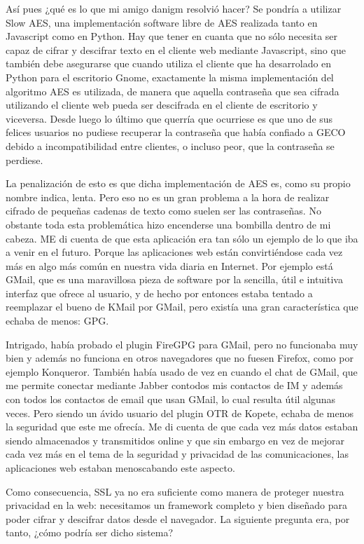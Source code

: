 Así pues ¿qué es lo que mi amigo danigm resolvió hacer? Se pondría a utilizar Slow AES, una implementación software libre de AES realizada tanto en Javascript como en Python. Hay que tener en cuanta que no sólo necesita ser capaz de cifrar y descifrar texto en el cliente web mediante Javascript, sino que también debe asegurarse que cuando utiliza el cliente que ha desarrolado en Python para el escritorio Gnome, exactamente la misma implementación del algoritmo AES es utilizada, de manera que aquella contraseña que sea cifrada utilizando el cliente web pueda ser descifrada en el cliente de escritorio y viceversa. Desde luego lo último que querría que ocurriese es que uno de sus felices usuarios no pudiese recuperar la contraseña que había confiado a GECO debido a incompatibilidad entre clientes, o incluso peor, que la contraseña se perdiese.

La penalización de esto es que dicha implementación de AES es, como su propio nombre indica, lenta. Pero eso no es un gran problema a la hora de realizar cifrado de pequeñas cadenas de texto como suelen ser las contraseñas. No obstante toda esta problemática hizo encenderse una bombilla dentro de mi cabeza. ME di cuenta de que esta aplicación era tan sólo un ejemplo de lo que iba a venir en el futuro. Porque las aplicaciones web están convirtiéndose cada vez más en algo más común en nuestra vida diaria en Internet. Por ejemplo está GMail, que es una maravillosa pieza de software por la sencilla, útil e intuitiva interfaz que ofrece al usuario, y de hecho por entonces estaba tentado a reemplazar el bueno de KMail por GMail, pero existía una gran característica que echaba de menos: GPG.

Intrigado, había probado  el plugin FireGPG para GMail, pero no funcionaba muy bien y además no funciona en otros navegadores que no fuesen Firefox, como por ejemplo Konqueror. También había usado de vez en cuando el chat de GMail, que me permite conectar mediante Jabber contodos mis contactos de IM y además con todos los contactos de email que usan GMail, lo cual resulta útil algunas veces. Pero siendo un ávido usuario del plugin OTR de Kopete, echaba de menos la seguridad que este me ofrecía. Me di cuenta de que cada vez más datos estaban siendo almacenados y transmitidos online y que sin embargo en vez de mejorar cada vez más en el tema de la seguridad y privacidad de las comunicaciones, las aplicaciones web estaban menoscabando este aspecto.

Como consecuencia, SSL ya no era suficiente como manera de proteger nuestra privacidad en la web: necesitamos un framework completo y bien diseñado para poder cifrar y descifrar datos desde el navegador. La siguiente pregunta era, por tanto, ¿cómo podría ser dicho sistema?

